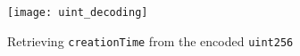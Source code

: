 \begin{figure}[H]
    \centering
    \texttt{[image: uint\_decoding]}
    \caption{Retrieving \texttt{creationTime} from the encoded \texttt{uint256}}
    \label{fig:uint_decoding}
\end{figure}